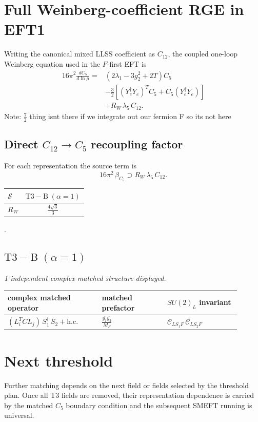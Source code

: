 \documentclass[9pt]{article}
\begin{document}
\section*{Full Weinberg-coefficient RGE in EFT1}
Writing the canonical mixed LLSS coefficient as $C_{12}$, the coupled one-loop Weinberg equation used in the $F$-first EFT is
\begin{align}
16\pi^2\frac{dC_5}{d\ln\mu}={}&(2\lambda_1-3g_2^2+2T)C_5\\
&-\frac32\left[(Y_e^\dagger Y_e)^T C_5+C_5(Y_e^\dagger Y_e)\right]\\
&+R_W\,\lambda_5\,C_{12}.
\end{align}
Note: $\frac{7}{2}$ thing isnt there if we integrate out our fermion F so its not here \subsection*{Direct $C_{12}\to C_5$ recoupling factor}
For each representation the source term is
\[16\pi^2\,\beta_{C_5}\supset R_W\,\lambda_5\,C_{12}.\]
\begin{longtable}{@{}lc@{}}
\toprule
$\mathcal{S}$ & $ \mathrm{T3-B}\;(\alpha=1) $ \\
\midrule
$R_W$ & $ \frac{4 \sqrt{3}}{3} $ \\
\bottomrule
\end{longtable}
.
\subsection*{$ \mathrm{T3-B}\;(\alpha=1) $}
\textit{1 independent complex matched structure displayed. }
\begin{longtable}{@{}p{0.36\linewidth}p{0.25\linewidth}p{0.29\linewidth}@{}}
\toprule
complex matched operator & matched prefactor & $SU(2)_L$ invariant \\
\midrule
$ (L_i^T C L_j)\,S_1^\dagger\,S_2+\mathrm{h.c.} $ & $ \frac{\overline{y_{1}} \overline{y_{2}}}{M_F} $ & $ \mathcal{C}_{LS_1F}\,\mathcal{C}_{LS_2F} $ \\
\bottomrule
\end{longtable}
\section*{Next threshold}
Further matching depends on the next field or fields selected by the threshold plan.  Once all T3 fields are removed, their representation dependence is carried by the matched $C_5$ boundary condition and the subsequent SMEFT running is universal.
\end{document}
